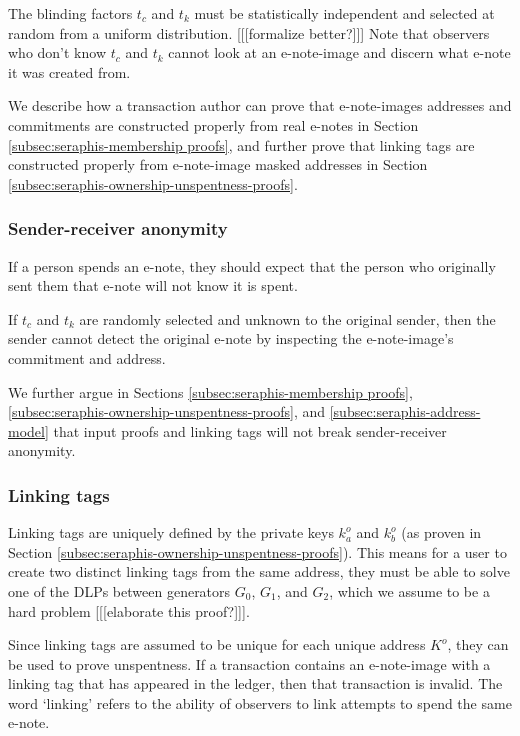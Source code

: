 The blinding factors $t_c$ and $t_k$ must be statistically independent and selected at random from a uniform distribution. [[[formalize better?]]] Note that observers who don't know $t_c$ and $t_k$ cannot look at an e-note-image and discern what e-note it was created from.

We describe how a transaction author can prove that e-note-images addresses and commitments are constructed properly from real e-notes in Section \ref{subsec:seraphis-membership proofs}, and further prove that linking tags are constructed properly from e-note-image masked addresses in Section \ref{subsec:seraphis-ownership-unspentness-proofs}.

\subsubsection{Sender-receiver anonymity}
\label{subsubsec:e-note-images-sender-receiver-anonymity}

If a person spends an e-note, they should expect that the person who originally sent them that e-note will not know it is spent.

If $t_c$ and $t_k$ are randomly selected and unknown to the original sender, then the sender cannot detect the original e-note by inspecting the e-note-image's commitment and address.

We further argue in Sections \ref{subsec:seraphis-membership proofs}, \ref{subsec:seraphis-ownership-unspentness-proofs}, and \ref{subsec:seraphis-address-model} that input proofs and linking tags will not break sender-receiver anonymity.

\subsubsection{Linking tags}
\label{subsubsec:e-note-images-linking-tags}

Linking tags are uniquely defined by the private keys $k^o_a$ and $k^o_b$ (as proven in Section \ref{subsec:seraphis-ownership-unspentness-proofs}). This means for a user to create two distinct linking tags from the same address, they must be able to solve one of the DLPs between generators $G_0$, $G_1$, and $G_2$, which we assume to be a hard problem [[[elaborate this proof?]]].

Since linking tags are assumed to be unique for each unique address $K^o$, they can be used to prove unspentness. If a transaction contains an e-note-image with a linking tag that has appeared in the ledger, then that transaction is invalid. The word `linking' refers to the ability of observers to link attempts to spend the same e-note.


